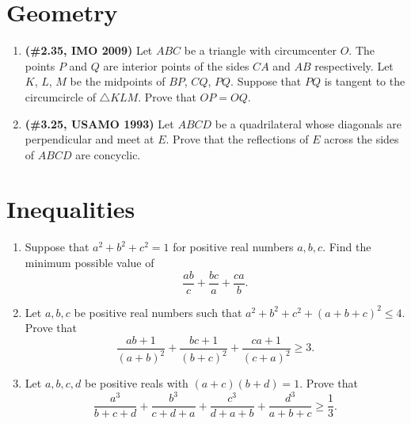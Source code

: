\documentclass[11pt]{article}
\begin{document}
    \section{Geometry}
      \begin{enumerate}[label=\textbf{\arabic*.}]
        \item \textbf{(\#2.35, IMO 2009)} Let $ABC$ be a triangle with circumcenter $O$. The points $P$ and $Q$ are interior points of the sides $CA$
          and $AB$ respectively. Let $K$, $L$, $M$ be the midpoints of $BP$, $CQ$, $PQ$. Suppose that $PQ$ is tangent to the circumcircle 
          of $\triangle KLM$. Prove that $OP = OQ$.

        \item \textbf{(\#3.25, USAMO 1993)} Let $ABCD$ be a quadrilateral whose diagonals are perpendicular and meet at $E$. Prove that the reflections
          of $E$ across the sides of $ABCD$ are concyclic.
      \end{enumerate}

    \section{Inequalities}
      \begin{enumerate}[label=\textbf{\arabic*.}]
        \item Suppose that $a^2 + b^2 + c^2 = 1$ for positive real numbers $a, b, c$. Find the minimum possible value of
          \[
            \frac{ab}{c} + \frac{bc}{a} + \frac{ca}{b}.
          \]
        \item Let $a, b, c$ be positive real numbers such that $a^2 + b^2 + c^2 + (a+b+c)^2 \le 4$. Prove that
          \[
            \frac{ab + 1}{(a+b)^2} + \frac{bc + 1}{(b+c)^2} + \frac{ca + 1}{(c+a)^2} \ge 3.
          \]
        \item Let $a, b, c, d$ be positive reals with $(a+c)(b+d) = 1$. Prove that
          \[
            \frac{a^3}{b+c+d} + \frac{b^3}{c+d+a} + \frac{c^3}{d+a+b} + \frac{d^3}{a+b+c} \ge \frac13.
          \]
      \end{enumerate}
\end{document}

